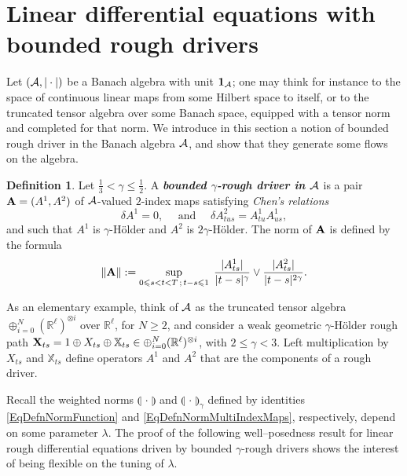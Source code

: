 \documentclass[11pt,a4paper]{amsart}
\newcommand{\RR}{\mathbb{R}}  \newcommand{\CC}{\mathbb{C}}  \newcommand{\LL}{\mathbb{L}}  \newcommand{\WW}{\mathbb{W}}
\newcommand{\bbX}{\mathbb{X}}
\renewcommand{\leq}{\leqslant}
\renewcommand{\geq}{\geqslant}
\theoremstyle{plain}%
\theoremstyle{definition}
\newtheorem{definition}[theorem]{Definition}
\theoremstyle{remark}
\numberwithin{equation}{section} %
\begin{document}
\section{Linear differential equations with bounded rough drivers}
\label{SectionBoundedDrivers}

Let $(\mathcal{A},|\cdot|)$ be a Banach algebra with unit ${\bf 1}_{\mathcal{A}}$; one may think for instance to the space of continuous linear maps from some Hilbert space to itself, or to the truncated tensor algebra over some Banach space, equipped with a tensor norm and completed for that norm. We introduce in this section a notion of bounded rough driver in the Banach algebra $\mathcal{A}$, and show that they generate some flows on the algebra. 

\begin{definition}
Let $\frac{1}{3}<\gamma\leq \frac{1}{2}$. A \textbf{\emph{bounded $\gamma$-rough driver in $\mathcal{A}$}} is a pair ${\bf A}= (A^1,A^2)$ of $\mathcal{A}$-valued $2$-index maps satisfying \emph{Chen's relations}
\begin{equation}
\label{EqChenRelations}
\delta A^1=0, \quad \textrm{ and }\quad \delta A^2_{tus} = A^1_{tu}A^1_{us},
\end{equation}
and such that $A^1$ is $\gamma$-H\"older and $A^2$ is $2\gamma$-H\"older. The norm of $\bf A$ is defined by the formula
$$
\| {\bf A} \| := \sup_{0\leq s<t<T\,;\,t-s\leq 1}\;\frac{|A^1_{ts}|}{|t-s|^\gamma}\vee\frac{|A^2_{ts}|}{|t-s|^{2\gamma}}.
$$
\end{definition}

\medskip

As an elementary example, think of $\mathcal{A}$ as the truncated tensor algebra $\oplus_{i=0}^N(\RR^\ell)^{\otimes i}$ over $\RR^\ell$, for $N\geq 2$, and consider a weak geometric $\gamma$-H\"older rough path ${\bfX}_{ts} = 1\oplus X_{ts}\oplus \bbX_{ts}\in \oplus_{i=0}^N(\RR^\ell)^{\otimes i}$, with $2\leq \gamma<3$. Left multiplication by $X_{ts}$ and $\bbX_{ts}$ define operators $A^1$ and $A^2$ that are the components of a rough driver.

\medskip

Recall the weighted norms $\llparenthesis\,\cdot\,\rrparenthesis$ and $\llparenthesis\,\cdot\,\rrparenthesis_\gamma$ defined by identities \eqref{EqDefnNormFunction} and \eqref{EqDefnNormMultiIndexMaps}, respectively, depend on some parameter $\lambda$. The proof of the following well--posedness result for linear rough differential equations driven by bounded $\gamma$-rough drivers shows the interest of being flexible on the tuning of $\lambda$.
\end{document}
